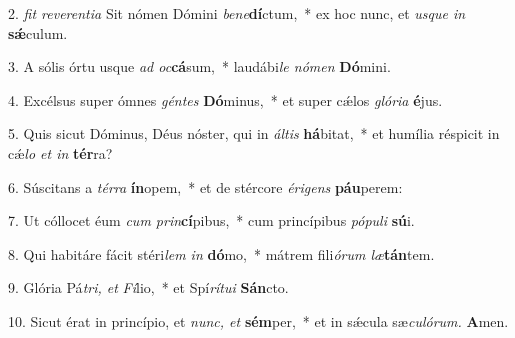 \item 2. \textit{fit reverentia} Sit nómen Dómini \textit{bene}\textbf{dí}ctum,~* ex hoc nunc, et \textit{usque in} \textbf{sǽ}culum.

\item 3. A sólis órtu usque \textit{ad oc}\textbf{cá}sum,~* laudábi\textit{le nómen} \textbf{Dó}mini.

\item 4. Excélsus super ómnes \textit{géntes} \textbf{Dó}minus,~* et super cǽlos \textit{glória} \textbf{é}jus.

\item 5. Quis sicut Dóminus, Déus nóster, qui in \textit{áltis} \textbf{há}bitat,~* et humília réspicit in cǽ\textit{lo et in} \textbf{tér}ra?

\item 6. Súscitans a \textit{térra} \textbf{ín}opem,~* et de stércore \textit{érigens} \textbf{páu}perem:

\item 7. Ut cóllocet éum \textit{cum prin}\textbf{cí}pibus,~* cum princípibus \textit{pópuli} \textbf{sú}i.

\item 8. Qui habitáre fácit stéri\textit{lem in} \textbf{dó}mo,~* mátrem fili\textit{órum læ}\textbf{tán}tem.

\item 9. Glória Pá\textit{tri, et} \textit{Fí}lio,~* et Spí\textit{rítui} \textbf{Sán}cto.

\item 10. Sicut érat in princípio, et \textit{nunc, et}\textbf{ sém}per,~* et in sǽcula sæ\textit{culórum.} \textbf{A}men.